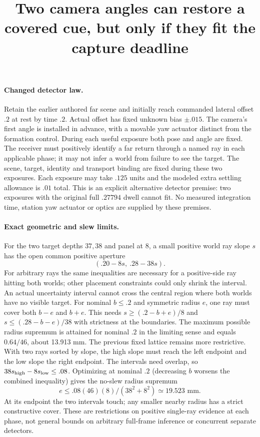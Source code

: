 \documentclass{article}
\begin{document}
\title{Two camera angles can restore a covered cue, but only if they fit the capture deadline}
\maketitle

\paragraph{Changed detector law.}
Retain the earlier authored far scene and initially reach commanded
lateral offset $.2$ at rest by time $.2$. Actual offset has fixed
unknown bias $\pm .015$. The camera's first angle is installed
in advance, with a movable yaw actuator distinct from the formation
control. During each useful exposure both pose and angle are fixed.
The receiver must positively identify a far return through a named
ray in each applicable phase; it may not infer a world from failure
to see the target. The scene, target, identity and transport binding
are fixed during these two exposures. Each exposure may take $.125$
units and the modeled extra settling allowance is $.01$ total. This
is an explicit alternative detector premise: two exposures with
the original full $.27794$ dwell cannot fit. No measured integration
time, station yaw actuator or optics are supplied by these premises.

\paragraph{Exact geometric and slew limits.}
For the two target depths $37,38$ and panel at 8, a small positive
world ray slope $s$ has the open common positive aperture
\[
 (.20-8s,\ .28-38s).
\]
For arbitrary rays the same inequalities are necessary for a
positive-side ray hitting both worlds; other placement constraints
could only shrink the interval. An actual uncertainty interval
cannot cross the central region where both worlds have no visible
target. For nominal $b\le .2$ and symmetric radius $e$, one ray
must cover both $b-e$ and $b+e$. This needs
$s\ge(.2-b+e)/8$ and $s\le(.28-b-e)/38$ with strictness at the
boundaries. The maximum possible radius supremum is attained for
nominal $.2$ in the limiting sense and equals $0.64/46$, about
13.913 mm. The previous fixed lattice remains more restrictive.
With two rays sorted by slope, the high slope must reach the
left endpoint and the low slope the right endpoint. The intervals
need overlap, so $38s_{\rm high}-8s_{\rm low}\le .08$. Optimizing
at nominal $.2$ (decreasing $b$ worsens the combined inequality)
gives the no-slew radius supremum
\[
 e\le .08(46)(8)/(38^2+8^2)\simeq19.523\text{ mm}.
\]
At its endpoint the two intervals touch; any smaller nearby
radius has a strict constructive cover. These are restrictions on
positive single-ray evidence at each phase, not general bounds
on arbitrary full-frame inference or concurrent separate detectors.
\end{document}
